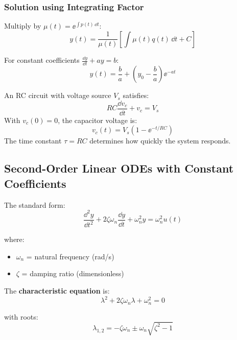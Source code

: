\subsubsection{Solution using Integrating Factor}
Multiply by $\mu(t) = \ee^{\int p(t) \, \dd t}$:
\begin{equation}
y(t) = \frac{1}{\mu(t)} \left[ \int \mu(t) q(t) \, \dd t + C \right]
\end{equation}

For constant coefficients $\frac{\dd y}{\dd t} + ay = b$:
\begin{equation}
y(t) = \frac{b}{a} + \left(y_0 - \frac{b}{a}\right)\ee^{-at}
\end{equation}

\begin{examplebox}[title=Example 0.2: RC Circuit]
An RC circuit with voltage source $V_s$ satisfies:
\begin{equation}
RC\frac{\dd v_c}{\dd t} + v_c = V_s
\end{equation}
With $v_c(0) = 0$, the capacitor voltage is:
\begin{equation}
v_c(t) = V_s\left(1 - \ee^{-t/RC}\right)
\end{equation}
The time constant $\tau = RC$ determines how quickly the system responds.
\end{examplebox}

\subsection{Second-Order Linear ODEs with Constant Coefficients}

The standard form:
\begin{equation}
\frac{\dd^2 y}{\dd t^2} + 2\zeta\omega_n\frac{\dd y}{\dd t} + \omega_n^2 y = \omega_n^2 u(t)
\end{equation}

where:
\begin{itemize}
    \item $\omega_n$ = natural frequency (rad/s)
    \item $\zeta$ = damping ratio (dimensionless)
\end{itemize}

The \textbf{characteristic equation} is:
\begin{equation}
\lambda^2 + 2\zeta\omega_n\lambda + \omega_n^2 = 0
\end{equation}

with roots:
\begin{equation}
\lambda_{1,2} = -\zeta\omega_n \pm \omega_n\sqrt{\zeta^2 - 1}
\end{equation}

